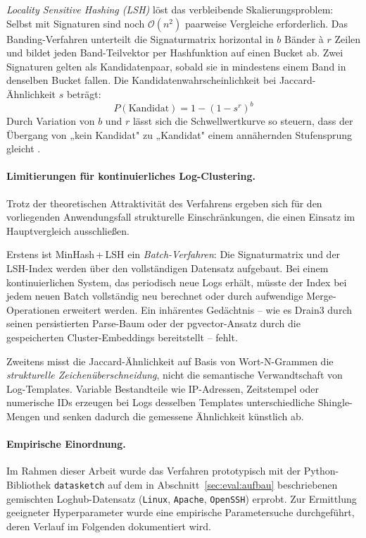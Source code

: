 \textit{Locality Sensitive Hashing (LSH)} löst das verbleibende
Skalierungsproblem: Selbst mit Signaturen sind noch $\mathcal{O}(n^2)$
paarweise Vergleiche erforderlich. Das Banding-Verfahren unterteilt die
Signaturmatrix horizontal in $b$ Bänder à $r$ Zeilen und bildet jeden
Band-Teilvektor per Hashfunktion auf einen Bucket ab. Zwei Signaturen gelten
als Kandidatenpaar, sobald sie in mindestens einem Band in denselben Bucket
fallen. Die Kandidatenwahrscheinlichkeit bei Jaccard-Ähnlichkeit $s$ beträgt:
\begin{equation}
    P(\text{Kandidat}) = 1 - (1 - s^r)^b
    \label{eq:lsh_prob}
\end{equation}
Durch Variation von $b$ und $r$ lässt sich die Schwellwertkurve so steuern, dass
der Übergang von „kein Kandidat" zu „Kandidat" einem annähernden Stufensprung
gleicht \cite{Leskovec2020_Kap3_4_2}.

\paragraph{Limitierungen für kontinuierliches Log-Clustering.}
Trotz der theoretischen Attraktivität des Verfahrens ergeben sich für den
vorliegenden Anwendungsfall strukturelle Einschränkungen, die einen Einsatz
im Hauptvergleich ausschließen.

Erstens ist MinHash\,+\,LSH ein \textit{Batch-Verfahren}: Die Signaturmatrix und
der LSH-Index werden über den vollständigen Datensatz aufgebaut. Bei einem
kontinuierlichen System, das periodisch neue Logs erhält, müsste der Index bei
jedem neuen Batch vollständig neu berechnet oder durch aufwendige
Merge-Operationen erweitert werden. Ein inhärentes Gedächtnis – wie es Drain3
durch seinen persistierten Parse-Baum oder der pgvector-Ansatz durch die
gespeicherten Cluster-Embeddings bereitstellt – fehlt.

Zweitens misst die Jaccard-Ähnlichkeit auf Basis von Wort-N-Grammen die
\textit{strukturelle Zeichenüberschneidung}, nicht die semantische Verwandtschaft
von Log-Templates. Variable Bestandteile wie IP-Adressen, Zeitstempel oder
numerische IDs erzeugen bei Logs desselben Templates unterschiedliche
Shingle-Mengen und senken dadurch die gemessene Ähnlichkeit künstlich ab.

\paragraph{Empirische Einordnung.}
Im Rahmen dieser Arbeit wurde das Verfahren prototypisch mit der Python-Bibliothek
\texttt{datasketch} auf dem in Abschnitt~\ref{sec:eval:aufbau} beschriebenen
gemischten Loghub-Datensatz (\texttt{Linux}, \texttt{Apache}, \texttt{OpenSSH})
erprobt.
Zur Ermittlung geeigneter Hyperparameter wurde eine empirische Parametersuche
durchgeführt, deren Verlauf im Folgenden dokumentiert wird.

